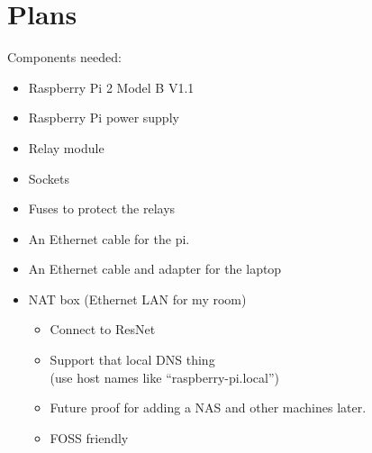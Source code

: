 \documentclass{article}
\begin{document}
\section{Plans}

Components needed:
\begin{itemize}
 \item Raspberry Pi 2 Model B V1.1
 \item Raspberry Pi power supply
 \item Relay module
 \item Sockets
 \item Fuses to protect the relays
 \item An Ethernet cable for the pi.
 \item An Ethernet cable and adapter for the laptop
 \item NAT box (Ethernet LAN for my room)
       \begin{itemize}
        \item Connect to ResNet
        \item Support that local DNS thing
              \\ (use host names like ``raspberry-pi.local'')
        \item Future proof for adding a NAS and other machines later.
        \item FOSS friendly
       \end{itemize}
\end{itemize}
\end{document}
